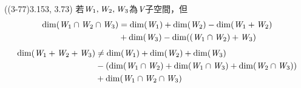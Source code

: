 \item \begin{theorem}{((3-77)3.153, 3.73)} 若$\textit{W}_1, \textit{W}_2, \textit{W}_3$為$\textit{V}$子空間，但
	\begin{equation}
		\begin{aligned}
			\dim(\textit{W}_1 \cap \textit{W}_2 \cap \textit{W}_3) 
			& = \dim(\textit{W}_1) + \dim(\textit{W}_2) - \dim(\textit{W}_1 + \textit{W}_2) \\
			& + \dim(\textit{W}_3) - \dim((\textit{W}_1 \cap \textit{W}_2) + \textit{W}_3) 
		\end{aligned}
	\end{equation}
	\begin{equation}
		\begin{aligned}
			\dim(\textit{W}_1 + \textit{W}_2 + \textit{W}_3) 
			& \neq \dim(\textit{W}_1) + \dim(\textit{W}_2) + \dim(\textit{W}_3) \\
			& - (\dim(\textit{W}_1 \cap \textit{W}_2) + \dim(\textit{W}_1 \cap \textit{W}_3) + \dim(\textit{W}_2 \cap \textit{W}_3)) \\
			& + \dim(\textit{W}_1 \cap \textit{W}_2 \cap \textit{W}_3) 
		\end{aligned}
	\end{equation}
\end{theorem}
